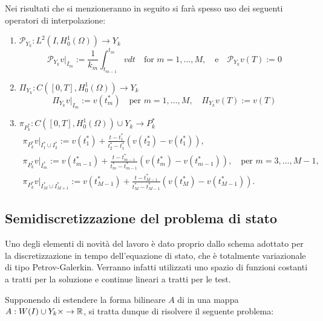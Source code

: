 Nei risultati che si menzioneranno in seguito si farà spesso uso dei seguenti operatori di interpolazione:
\begin{enumerate}
\item $\mathcal{P}_{Y_{k}}:L^2(I,H^1_0(\Omega))\to Y_k$
\[
\mathcal{P}_{Y_{k}} v|_{I_{m}}:=\frac{1}{k_{m}} \int^{t_{m}}_{t_{m-1}}vdt\quad \text{for $m=1,\dots,M$},\quad\text{e}\quad \mathcal{P}_{Y_{k}}v(T):=0
\]
\item $\Pi_{Y_{k}}:C([0,T],H^1_0(\Omega))\to Y_k$
\[
\Pi_{Y_{k}} v|_{I_{m}}:=v(t^*_m)\quad\text{per $m=1,\dots,M$},\quad \Pi_{Y_{k}} v(T):=v(T)
\]
\item $\pi_{P^*_k}:C([0,T],H^1_0(\Omega))\cup Y_k\to P^*_k$
\begin{gather*}
\pi_{P^*_k} v|_{I^*_1\cup I^*_2}:=v(t^*_1)+\frac{t-t^*_1}{t^*_2-t^*_1}(v(t^*_2)-v(t^*_1)),\\
\pi_{P^*_k} v|_{I^*_m}:=v(t^*_{m-1})+\frac{t-t^*_{m-1}}{t^*_{m}-t^*_{m-1}}(v(t^*_m)-v(t^*_{m-1})),\quad\text{per $m=3,\dots,M-1$},\\
\pi_{P^*_k} v|_{I^*_M\cup I^*_{M+1}}:=v(t^*_{M-1})+\frac{t-t^*_{M-1}}{t^*_M-t^*_{M-1}}(v(t^*_M)-v(t^*_{M-1})).
\end{gather*}
\end{enumerate} 


\subsection{Semidiscretizzazione del problema di stato}
Uno degli elementi di novità del lavoro \cite{MAIN} è dato proprio dallo schema adottato per la discretizzazione in tempo dell'equazione di stato, che è totalmente variazionale di tipo Petrov-Galerkin. Verranno infatti utilizzati uno spazio di funzioni costanti a tratti per la soluzione e continue lineari a tratti per le test. 

Supponendo di estendere la forma bilineare $A$ di \cite{MAIN} in una mappa $A:W(I)\cup Y_k\times\to\mathbb{R}$, si tratta dunque di risolvere il seguente problema:

